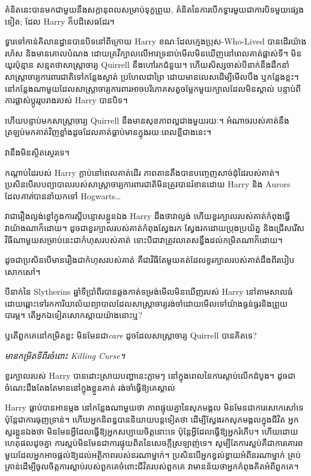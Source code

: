 {{គំនិតនេះបានមកជាមួយនឹងសក្តានុពលសម្រាប់ទុក្ខព្រួយ, គំនិតនៃការបើកទ្វារមួយជាការបិទមួយផ្សេងទៀត; ដែល Harry ក៏បដិសេធដែរ។

\later

ទ្វារទៅកាន់គិលានដ្ឋានបានបិទនៅពីក្រោយ Harry ខណៈដែលក្មេងប្រុស-Who-Lived បានដើរយ៉ាងរហ័ស និងមានគោលបំណង ដោយគ្រវីក្បាលលើអាវទ្រនាប់មើលមិនឃើញនៅពេលគាត់ផ្លាស់ទី។ មិនយូរប៉ុន្មាន សន្មតថាសាស្រ្តាចារ្យ Quirrell នឹងហៅរកជំនួយ។ ហើយសិស្សចាស់បីនាក់នឹងដឹកនាំសាស្ត្រាចារ្យការពារជាតិទៅកន្លែងស្ងាត់ ប្រហែលជាព្រៃ ដោយមានលេសដើម្បីមើលបឹង ឬកន្លែងខ្លះ។ នៅកន្លែងណាមួយដែលសាស្រ្តាចារ្យការពារអាចបរិភោគសត្វចម្លែកមួយក្បាលដែលមិនស្គាល់ បន្ទាប់ពីការផ្លាស់ប្តូររូបរាងរបស់ Harry បានបិទ។

ហើយបន្ទាប់មកសាស្រ្តាចារ្យ Quirrell នឹងមានសុខភាពល្អជាងមួយរយៈ។ អំណាច​របស់​គាត់​នឹង​ត្រឡប់​មក​គាត់​វិញ​ខ្លាំង​ដូច​ដែល​គាត់​ធ្លាប់​មាន​ក្នុង​រយៈពេល​ខ្លី​ជាង​នេះ។

វានឹងមិនស្ថិតស្ថេរទេ។

កណ្ដាប់ដៃរបស់ Harry ក្តាប់នៅពេលគាត់ដើរ ភាពតានតឹងបានបញ្ចេញសាច់ដុំដៃរបស់គាត់។ ប្រសិនបើរបបព្យាបាលរបស់សាស្ត្រាចារ្យការពារជាតិមិនត្រូវបានរំខានដោយ Harry និង Aurors ដែល\emph{គាត់}បាននាំយកទៅ Hogwarts…

វាជារឿងល្ងង់ខ្លៅក្នុងការស្តីបន្ទោសខ្លួនឯង Harry ដឹងថាវាល្ងង់ ហើយខួរក្បាលរបស់គាត់កំពុងធ្វើវាយ៉ាងណាក៏ដោយ។ ដូចជាខួរក្បាលរបស់គាត់កំពុងស្វែងរក ស្វែងរកដោយប្រុងប្រយ័ត្ន និងជ្រើសរើសវិធីណាមួយសម្រាប់នេះជាកំហុសរបស់គាត់ ទោះបីជាវាត្រូវលាតសន្ធឹងដល់កម្រិតណាក៏ដោយ។

ដូចជាប្រសិនបើមានរឿងជាកំហុសរបស់គាត់ គឺជាវិធីតែមួយគត់ដែលខួរក្បាលរបស់គាត់ដឹងពីរបៀបសោកសៅ។

បីនាក់នៃ Slytherins ឆ្នាំទីប្រាំពីរបានឆ្លងកាត់ទម្រង់មើលមិនឃើញរបស់ Harry នៅតាមសាលធំដោយឆ្ពោះទៅរកការិយាល័យព្យាបាលដែលសាស្រ្តាចារ្យរង់ចាំដោយមើលទៅយ៉ាងធ្ងន់ធ្ងរនិងព្រួយបារម្ភ។ តើ​អ្នក​ឯ​ទៀត​សោក​ស្តាយ​យ៉ាង​នោះ​ឬ?

ឬតើពួកគេនៅកម្រិតខ្លះ មិនមែនជា\emph{care} ដូចដែលសាស្រ្តាចារ្យ Quirrell បានគិតទេ?

\emph{មានកម្រិតទីពីរចំពោះ Killing Curse។}

ខួរក្បាលរបស់ Harry បានដោះស្រាយបញ្ហានេះភ្លាមៗ នៅក្នុងពេលនៃការស្តាប់លើកដំបូង។ ដូចជាចំណេះដឹងតែងតែមាននៅក្នុងខ្លួនគាត់ រង់ចាំធ្វើឱ្យគេស្គាល់

Harry ធ្លាប់បានអានម្តង នៅកន្លែងណាមួយថា ភាពផ្ទុយគ្នានៃសុភមង្គល មិនមែនជាការសោកសៅទេ ប៉ុន្តែជាការធុញទ្រាន់។ ហើយអ្នកនិពន្ធបាននិយាយបន្តទៀតថា ដើម្បីស្វែងរកសុភមង្គលក្នុងជីវិត អ្នកសួរខ្លួនឯងថា មិនមែនអ្វីដែលធ្វើឱ្យអ្នកសប្បាយចិត្តនោះទេ ប៉ុន្តែអ្វីដែលធ្វើឱ្យអ្នករំភើប។ ហើយ​ដោយ​ហេតុផល​ដូចគ្នា ការ​ស្អប់​មិន​មែន​ជា​ការ​ផ្ទុយ​ពិត​នៃ​សេចក្តី​ស្រឡាញ់​ទេ។ សូម្បី​តែ​ការ​ស្អប់​គឺ​ជា​ការ​គោរព​មួយ​ដែល​អ្នក​អាច​ផ្តល់​ឱ្យ​ដល់​អត្ថិភាព​របស់​នរណា​ម្នាក់។ ប្រសិនបើអ្នកខ្វល់ខ្វាយអំពីនរណាម្នាក់ គ្រប់គ្រាន់ដើម្បីចូលចិត្តការស្លាប់របស់ពួកគេចំពោះជីវិតរបស់ពួកគេ វាមានន័យថាអ្នកកំពុងគិតអំពីពួកគេ។

}}
